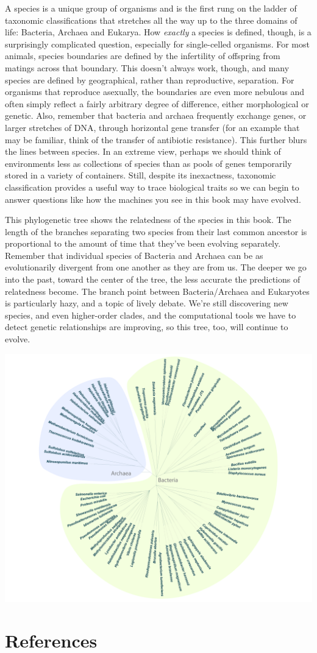 \documentclass[]{tufte-book}
\begin{document}
A species is a unique group of organisms and is the first rung on the
ladder of taxonomic classifications that stretches all the way up to the
three domains of life: Bacteria, Archaea and Eukarya. How \emph{exactly}
a species is defined, though, is a surprisingly complicated question,
especially for single-celled organisms. For most animals, species
boundaries are defined by the infertility of offspring from matings
across that boundary. This doesn't always work, though, and many species
are defined by geographical, rather than reproductive, separation. For
organisms that reproduce asexually, the boundaries are even more
nebulous and often simply reflect a fairly arbitrary degree of
difference, either morphological or genetic. Also, remember that
bacteria and archaea frequently exchange genes, or larger stretches of
DNA, through horizontal gene transfer (for an example that may be
familiar, think of the transfer of antibiotic resistance). This further
blurs the lines between species. In an extreme view, perhaps we should
think of environments less as collections of species than as pools of
genes temporarily stored in a variety of containers. Still, despite its
inexactness, taxonomic classification provides a useful way to trace
biological traits so we can begin to answer questions like how the
machines you see in this book may have evolved.

This phylogenetic tree shows the relatedness of the species in this
book. The length of the branches separating two species from their last
common ancestor is proportional to the amount of time that they've been
evolving separately. Remember that individual species of Bacteria and
Archaea can be as evolutionarily divergent from one another as they are
from us. The deeper we go into the past, toward the center of the tree,
the less accurate the predictions of relatedness become. The branch
point between Bacteria/Archaea and Eukaryotes is particularly hazy, and
a topic of lively debate. We're still discovering new species, and even
higher-order clades, and the computational tools we have to detect
genetic relationships are improving, so this tree, too, will continue to
evolve.

\includegraphics{img/Tree}

\chapter{References}\label{references}


\end{document}
